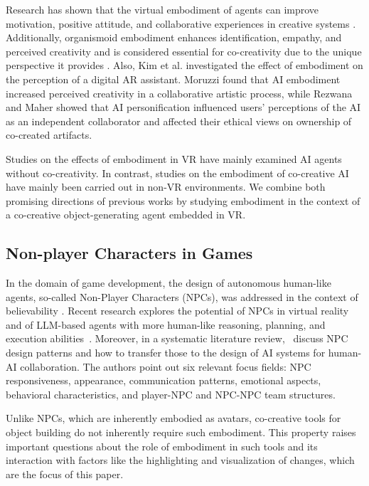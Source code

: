 Research has shown that the virtual embodiment of agents can improve motivation, positive attitude, and collaborative experiences in creative systems \cite{baylor_promoting_2009, rezwana_understanding_2022, davis_empirically_2016}. Additionally, organismoid embodiment enhances identification, empathy, and perceived creativity and is considered essential for co-creativity due to the unique perspective it provides \cite{guckelsberger_embodiment_2021}. Also, Kim et al. \cite{kim_does_2018} investigated the effect of embodiment on the perception of a digital AR assistant.
Moruzzi \cite{moruzzi_artificial_2022} found that AI embodiment increased perceived creativity in a collaborative artistic process, while Rezwana and Maher \cite{rezwana_user_2023} showed that AI personification influenced users' perceptions of the AI as an independent collaborator and affected their ethical views on ownership of co-created artifacts.



Studies on the effects of embodiment in VR have mainly examined AI agents without co-creativity. In contrast, studies on the embodiment of co-creative AI have mainly been carried out in non-VR environments.
We combine both promising directions of previous works by studying embodiment in the context of a co-creative object-generating agent embedded in VR.

\subsection{Non-player Characters in Games} %
In the domain of game development, the design of autonomous human-like agents, so-called Non-Player Characters (NPCs), was addressed in the context of believability \cite{10.1145/176789.176803}. Recent research explores the potential of NPCs in virtual reality~\cite{10.1145/3677098} and of LLM-based agents with more human-like reasoning, planning, and execution abilities~\cite{10.1145/3586183.3606763}. Moreover, in a systematic literature review,~\citet{wittmann2022} discuss NPC design patterns and how to transfer those to the design of AI systems for human-AI collaboration. The authors point out six relevant focus fields: NPC responsiveness, appearance, communication patterns, emotional aspects, behavioral characteristics, and player-NPC and NPC-NPC team structures.

Unlike NPCs, which are inherently embodied as avatars, co-creative tools for object building do not inherently require such embodiment. This property raises important questions about the role of embodiment in such tools and its interaction with factors like the highlighting and visualization of changes, which are the focus of this paper.




